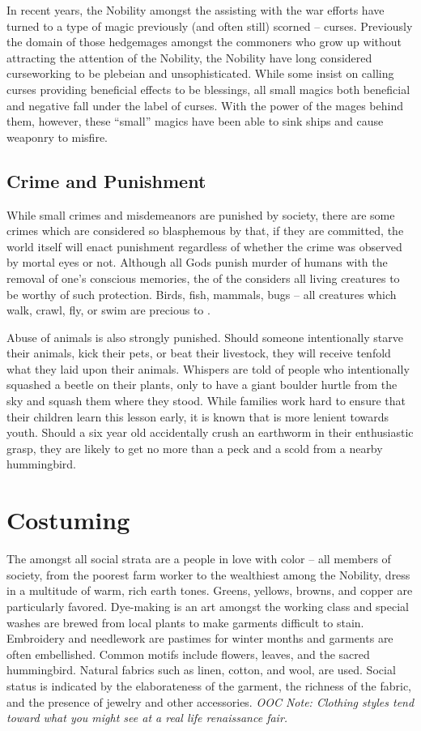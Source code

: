\documentclass[blue]{GL2020}
\begin{document}
In recent years, the Nobility amongst the \pFarm{} assisting with the war efforts have turned to a type of magic previously (and often still) scorned -- curses.  Previously the domain of those hedgemages amongst the commoners who grow up without attracting the attention of the Nobility, the Nobility have long considered curseworking to be plebeian and unsophisticated.  While some insist on calling curses providing beneficial effects to be blessings, all small magics both beneficial and negative fall under the label of curses.  With the power of the \pFarm{} mages behind them, however, these ``small'' magics have been able to sink ships and cause \pShip{} weaponry to misfire.

\subsection*{Crime and Punishment}
While small crimes and misdemeanors are punished by society, there are some crimes which are considered so blasphemous by \cFarmGod{} that, if they are committed, the world itself will enact punishment regardless of whether the crime was observed by mortal eyes or not.  Although all Gods punish murder of humans with the removal of one's conscious memories, the \cFarmGod{\God} of the \pFarm{} considers all living creatures to be worthy of such protection.  Birds, fish, mammals, bugs – all creatures which walk, crawl, fly, or swim are precious to \cFarmGod{}. 

Abuse of animals is also strongly punished.  Should someone intentionally starve their animals, kick their pets, or beat their livestock, they will receive tenfold what they laid upon their animals.  Whispers are told of people who intentionally squashed a beetle on their plants, only to have a giant boulder hurtle from the sky and squash them where they stood.  While families work hard to ensure that their children learn this lesson early, it is known that \cFarmGod{} is more lenient towards youth.  Should a six year old accidentally crush an earthworm in their enthusiastic grasp, they are likely to get no more than a peck and a scold from a nearby hummingbird. 

\section*{Costuming}
The \pFarm{} amongst all social strata are a people in love with color – all members of society, from the poorest farm worker to the wealthiest among the Nobility, dress in a multitude of warm, rich earth tones.  Greens, yellows, browns, and copper are particularly favored.  Dye-making is an art amongst the working class and special washes are brewed from local plants to make garments difficult to stain.  Embroidery and needlework are pastimes for winter months and garments are often embellished.  Common motifs include flowers, leaves, and the sacred hummingbird.  Natural fabrics such as linen, cotton, and wool, are used.  Social status is indicated by the elaborateness of the garment, the richness of the fabric, and the presence of jewelry and other accessories. \emph{OOC Note: Clothing styles tend toward what you might see at a real life renaissance fair.}
\end{document}
